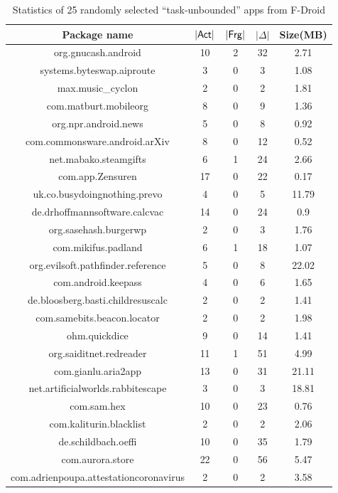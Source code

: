 \begin{table}[htbp] 
	\begin{center}   
		\begin{tabular}{|c|c|c|c|c|}   
			\hline   \textbf{Package name} &\textbf{$|{\sf Act}|$} & \textbf{$|{\sf Frg}|$} & \textbf{$|\Delta|$} & \textbf{Size(MB)} \\   
			\hline   org.gnucash.android & 10 & 2& 32 & 2.71  \\ 
			\hline     systems.byteswap.aiproute & 3& 0& 3& 1.08  \\ 
			\hline   max.music\_cyclon & 2& 0& 2& 1.81 \\ 
			\hline     com.matburt.mobileorg & 8& 0& 9& 1.36 \\ 
			\hline    org.npr.android.news & 5& 0& 8& 0.92 \\ 
			\hline     com.commonsware.android.arXiv & 8& 0& 12& 0.52 \\ 
			\hline     net.mabako.steamgifts & 6& 1& 24& 2.66 \\ 
			\hline    com.app.Zensuren & 17& 0& 22& 0.17 \\ 
			\hline     uk.co.busydoingnothing.prevo & 4& 0& 5& 11.79 \\ 
			\hline     de.drhoffmannsoftware.calcvac & 14& 0& 24& 0.9 \\ 
			\hline     org.sasehash.burgerwp & 2& 0& 3& 1.76 \\ 
			\hline     com.mikifus.padland & 6& 1& 18& 1.07  \\ 
			\hline    org.evilsoft.pathfinder.reference & 5& 0& 8& 22.02  \\ 
			\hline     com.android.keepass & 4& 0& 6& 1.65  \\ 
			\hline     de.bloosberg.basti.childresuscalc & 2& 0& 2& 1.41  \\ 
			\hline     com.samebits.beacon.locator & 2& 0& 2& 1.98  \\ 
			\hline     ohm.quickdice & 9& 0& 14& 1.41  \\ 
			\hline    org.saiditnet.redreader & 11& 1& 51& 4.99  \\ 
			\hline    com.gianlu.aria2app & 13& 0& 31& 21.11  \\ 
			\hline     net.artificialworlds.rabbitescape & 3& 0& 3& 18.81  \\ 
			\hline     com.sam.hex & 10& 0& 23& 0.76  \\ 
			\hline    com.kaliturin.blacklist & 2& 0& 2& 2.06  \\ 
			\hline     de.schildbach.oeffi & 10& 0& 35& 1.79  \\ 
			\hline     com.aurora.store & 22& 0& 56& 5.47  \\ 
			\hline    com.adrienpoupa.attestationcoronavirus & 2& 0& 2& 3.58  \\ 
			\hline
			\end{tabular}   
		\caption{Statistics of 25 randomly selected ``task-unbounded'' apps from F-Droid\label{tab:t-unb-rand-fd} }
\end{center}   
\end{table}

